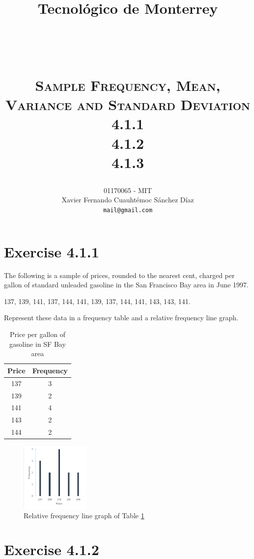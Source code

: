 \documentclass[titlepage, letterpaper, fleqn]{article}
\title{
\vspace{1in}
\textbf{Tecnológico de Monterrey} \\
\vspace{0.5in}
\textmd{\mahclass} \\
\large{\textit{\mahteacher}} \\
\vspace{0.5in}
\textsc{\mahtitle}\\
\textsc{Sample Frequency, Mean, Variance and Standard Deviation}\\
\textsc{4.1.1}\\
\textsc{4.1.2}\\
\textsc{4.1.3}\\
\author{01170065  - MIT \\
Xavier Fernando Cuauhtémoc Sánchez Díaz \\
\texttt{mail@gmail.com}}
\date{\mahdate}
}
\newcommand{\spacepls}{\vspace{5mm}}
\begin{document}
\begin{titlepage}
\maketitle
\end{titlepage}

%
%

\section{Exercise 4.1.1}

{\large The following is a sample of prices, rounded to the nearest cent, charged per gallon of standard unleaded gasoline in the San Francisco Bay area in June 1997.

137, 139, 141, 137, 144, 141, 139, 137, 144, 141, 143, 143, 141.

Represent these data in a frequency table and a relative frequency line graph.}

\begin{table}[h!]
\centering
\begin{tabular}{@{}cc@{}}
\toprule
Price & Frequency \\ \midrule
137   & 3         \\
139   & 2         \\
141   & 4         \\
143   & 2         \\
144   & 2         \\ \bottomrule
\end{tabular}
\caption{Price per gallon of gasoline in SF Bay area}
\label{tab:4.1.1}
\end{table}

\spacepls

\begin{figure}[h!]
	\centering
	\includegraphics[width=0.3\textwidth]{img_4_1_1}
	\caption{Relative frequency line graph of Table \ref{tab:4.1.1}}
	\label{fig:4.1.1}
\end{figure}

\section{Exercise 4.1.2}
\end{document}
